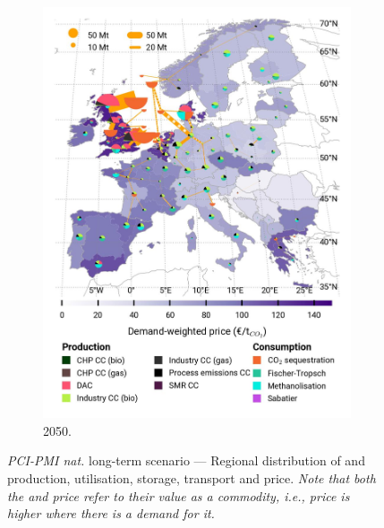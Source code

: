 \documentclass[preprint,12pt,sort&compress]{elsarticle}
\begin{document}
\begin{figure}[htbp]
\begin{subfigure}[t]{0.33\textwidth}
      \includegraphics[width=1\textwidth]{maps/pcipmi-national-expansion/base_s_adm___2050-balance_map_co2_stored} 
      \caption{ 2050.}
      \label{fig:PCI-n_lt_2050_co2}
  \end{subfigure}
  \vspace{0.3cm}
  \caption{\textit{PCI-PMI nat.} long-term scenario --- Regional distribution of  and  production, utilisation, storage, transport and price. \textit{Note that both the  and  price refer to their value as a commodity, i.e., price is higher where there is a demand for it.}}
  \label{fig:PCI-n_lt}
\end{figure}
\end{document}
